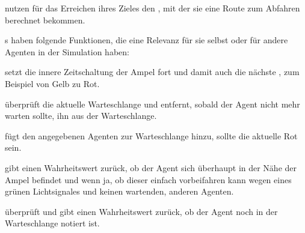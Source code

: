  nutzen für das Erreichen ihres Zieles den , mit der sie eine Route zum Abfahren berechnet bekommen.


s haben folgende Funktionen, die eine Relevanz für sie selbst oder für andere Agenten in der Simulation haben:

 setzt die innere Zeitschaltung der Ampel fort und damit auch die nächste , zum Beispiel von Gelb zu Rot.

 überprüft die aktuelle Warteschlange und entfernt, sobald der Agent nicht mehr warten sollte, ihn aus der Warteschlange.

 fügt den angegebenen Agenten zur Warteschlange hinzu, sollte die aktuelle  Rot sein.

 gibt einen Wahrheitswert zurück, ob der Agent sich überhaupt in der Nähe der Ampel befindet und wenn ja, ob dieser einfach vorbeifahren kann wegen eines grünen Lichtsignales und keinen wartenden, anderen Agenten.

 überprüft und gibt einen Wahrheitswert zurück, ob der Agent noch in der Warteschlange notiert ist.

